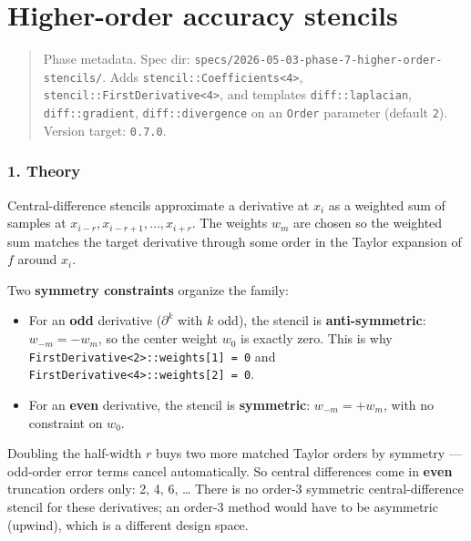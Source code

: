 \chapter{Higher-order accuracy stencils}
\label{chap:dev:higher-order-accuracy-stencils}

\begin{quote}
Phase metadata. Spec dir:
\passthrough{\lstinline!specs/2026-05-03-phase-7-higher-order-stencils/!}.
Adds \passthrough{\lstinline!stencil::Coefficients<4>!},
\passthrough{\lstinline!stencil::FirstDerivative<4>!}, and templates
\passthrough{\lstinline!diff::laplacian!},
\passthrough{\lstinline!diff::gradient!},
\passthrough{\lstinline!diff::divergence!} on an
\passthrough{\lstinline!Order!} parameter (default
\passthrough{\lstinline!2!}). Version target:
\passthrough{\lstinline!0.7.0!}.
\end{quote}

\subsection{1. Theory}\label{theory}

Central-difference stencils approximate a derivative at \(x_i\) as a
weighted sum of samples at \(x_{i-r}, x_{i-r+1}, \ldots, x_{i+r}\). The
weights \(w_m\) are chosen so the weighted sum matches the target
derivative through some order in the Taylor expansion of \(f\) around
\(x_i\).

Two \textbf{symmetry constraints} organize the family:

\begin{itemize}
\tightlist
\item
  For an \textbf{odd} derivative (\(\partial^k\) with \(k\) odd), the
  stencil is \textbf{anti-symmetric}: \(w_{-m} = -w_m\), so the center
  weight \(w_0\) is exactly zero. This is why
  \passthrough{\lstinline!FirstDerivative<2>::weights[1] = 0!} and
  \passthrough{\lstinline!FirstDerivative<4>::weights[2] = 0!}.
\item
  For an \textbf{even} derivative, the stencil is \textbf{symmetric}:
  \(w_{-m} = +w_m\), with no constraint on \(w_0\).
\end{itemize}

Doubling the half-width \(r\) buys two more matched Taylor orders by
symmetry --- odd-order error terms cancel automatically. So central
differences come in \textbf{even} truncation orders only: 2, 4, 6,
\ldots{} There is no order-3 symmetric central-difference stencil for
these derivatives; an order-3 method would have to be asymmetric
(upwind), which is a different design space.

